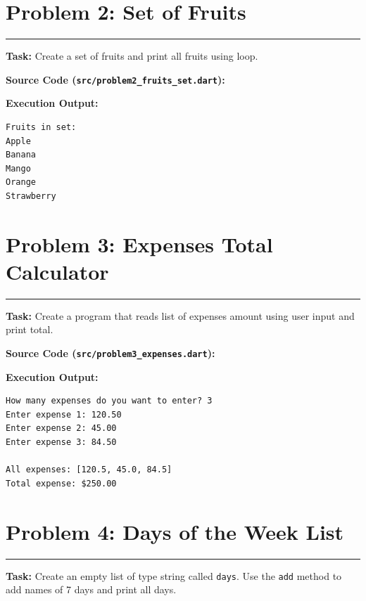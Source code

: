 \documentclass[11pt,a4paper]{article}
\begin{document}
\vspace{0.3cm}
\section*{Problem 2: Set of Fruits}
\noindent\rule{\textwidth}{0.4pt}\vspace{0.08cm}
\textbf{Task:} Create a set of fruits and print all fruits using loop.

\vspace{0.1cm}
\textbf{Source Code (\texttt{src/problem2\_fruits\_set.dart}):}


\textbf{Execution Output:}
\begin{lstlisting}[style=outputstyle]
Fruits in set:
Apple
Banana
Mango
Orange
Strawberry
\end{lstlisting}

\newpage

\section*{Problem 3: Expenses Total Calculator}
\noindent\rule{\textwidth}{0.4pt}\vspace{0.08cm}
\textbf{Task:} Create a program that reads list of expenses amount using user input and print total.

\vspace{0.1cm}
\textbf{Source Code (\texttt{src/problem3\_expenses.dart}):}


\textbf{Execution Output:}
\begin{lstlisting}[style=outputstyle]
How many expenses do you want to enter? 3
Enter expense 1: 120.50
Enter expense 2: 45.00
Enter expense 3: 84.50

All expenses: [120.5, 45.0, 84.5]
Total expense: $250.00
\end{lstlisting}

\vspace{0.3cm}
\section*{Problem 4: Days of the Week List}
\noindent\rule{\textwidth}{0.4pt}\vspace{0.08cm}
\textbf{Task:} Create an empty list of type string called \texttt{days}. Use the \texttt{add} method to add names of 7 days and print all days.
\end{document}
